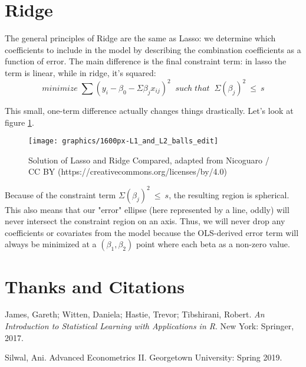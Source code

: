 \documentclass{article}                 %
\begin{document}
\section{Ridge}
	The general principles of Ridge are the same as Lasso: we determine which coefficients to include in the model by describing the combination coefficients as a function of error. The main difference is the final constraint term: in lasso the term is linear, while in ridge, it's squared: $$ minimize \; {\sum(y_i - \beta_0 - \Sigma\beta_{j}x_{ij} )^2} \; \; such \; that  \; \; \Sigma(\beta_j)^2 \: \leq \: s $$

	This small, one-term difference actually changes things drastically. Let's look at figure \ref{fig:f2}.
	\begin{figure} [H]
		\centering
		\caption{Solution of Lasso and Ridge Compared, adapted from Nicoguaro / CC BY (https://creativecommons.org/licenses/by/4.0)}
		\texttt{[image: graphics/1600px-L1\_and\_L2\_balls\_edit]}
		\label{fig:f2}
	\end{figure}
	Because of the  constraint term $\Sigma(\beta_{j})^2 \: \leq \: s $, the resulting region is spherical. This also means that our "error" ellipse (here represented by a line, oddly) will never intersect the constraint region on an axis. Thus, we will never drop any coefficients or covariates from the model because the OLS-derived error term will always be minimized at a $ (\beta_1, \beta_2 ) $ point where each beta as a non-zero value.

\section{Thanks and Citations}
James, Gareth; Witten, Daniela; Hastie, Trevor; Tibshirani, Robert. \textit{An Introduction to Statistical Learning
with Applications in R}. New York: Springer, 2017.

Silwal, Ani. Advanced Econometrics II. Georgetown University: Spring 2019.
\end{document}
